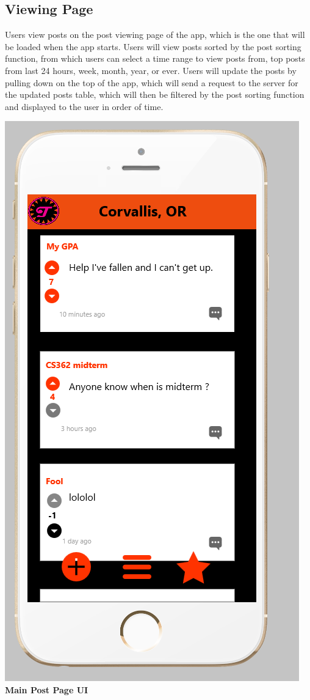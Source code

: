 \documentclass[12pt]{article}
\begin{document}
\begin{center}
\begin{center}
  \end{center}

\subsection{Viewing Page}
Users view posts on the post viewing page of the app, which is the one that will be loaded when the app starts. Users will view posts sorted by the post sorting function, from which users can select a time range to view posts from, top posts from last 24 hours, week, month, year, or ever. Users will update the posts by pulling down on the top of the app, which will send a request to the server for the updated posts table, which will then be filtered by the post sorting function and displayed to the user in order of time.
\begin{center}
\includegraphics[scale=0.30]{img/ui/view}\linebreak
\textbf{Main Post Page UI}
  \end{center}


\end{center}
\end{document}

